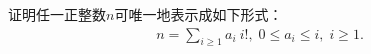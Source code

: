 证明任一正整数$n$可唯一地表示成如下形式：
\begin{align*}
    n = \sum_{i\ge 1} {a_i\ i!}, \;0\le a_i\le i, \;i\ge 1.
\end{align*}